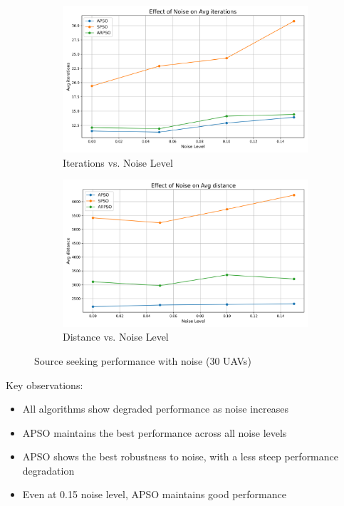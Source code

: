 \documentclass[conference]{IEEEtran}
\begin{document}
\begin{figure}[htbp]
\centering
\begin{subfigure}{0.49\linewidth}
    \centering
    \includegraphics[width=\linewidth]{../plots/r1_with_noise/avg_iterations_vs_noise.png}
    \caption{Iterations vs. Noise Level}
    \label{fig:iterations_vs_noise}
\end{subfigure}
\hfill
\begin{subfigure}{0.49\linewidth}
    \centering
    \includegraphics[width=\linewidth]{../plots/r1_with_noise/avg_distance_vs_noise.png}
    \caption{Distance vs. Noise Level}
    \label{fig:distance_vs_noise}
\end{subfigure}
\caption{Source seeking performance with noise (30 UAVs)}
\label{fig:source_seeking_with_noise}
\end{figure}

Key observations:
\begin{itemize}
    \item All algorithms show degraded performance as noise increases
    \item APSO maintains the best performance across all noise levels
    \item APSO shows the best robustness to noise, with a less steep performance degradation
    \item Even at 0.15 noise level, APSO maintains good performance
\end{itemize}
\end{document}
